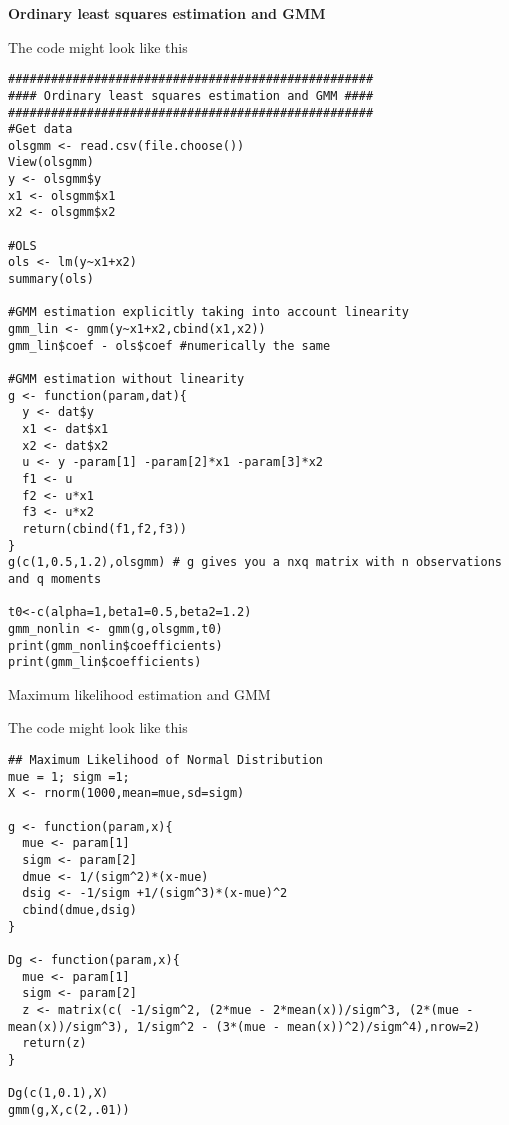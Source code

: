 \begin{Solution}{14.3}
\textbf{Ordinary least squares estimation and GMM}

The code might look like this
\begin{verbatim}
###################################################
#### Ordinary least squares estimation and GMM ####
###################################################
#Get data
olsgmm <- read.csv(file.choose())
View(olsgmm)
y <- olsgmm$y
x1 <- olsgmm$x1
x2 <- olsgmm$x2

#OLS
ols <- lm(y~x1+x2)
summary(ols)

#GMM estimation explicitly taking into account linearity
gmm_lin <- gmm(y~x1+x2,cbind(x1,x2))
gmm_lin$coef - ols$coef #numerically the same

#GMM estimation without linearity
g <- function(param,dat){
  y <- dat$y
  x1 <- dat$x1
  x2 <- dat$x2
  u <- y -param[1] -param[2]*x1 -param[3]*x2
  f1 <- u
  f2 <- u*x1
  f3 <- u*x2
  return(cbind(f1,f2,f3))
}
g(c(1,0.5,1.2),olsgmm) # g gives you a nxq matrix with n observations and q moments

t0<-c(alpha=1,beta1=0.5,beta2=1.2)
gmm_nonlin <- gmm(g,olsgmm,t0)
print(gmm_nonlin$coefficients)
print(gmm_lin$coefficients)
\end{verbatim}
\end{Solution}
\begin{Solution}{14.4}
Maximum likelihood estimation and GMM

The code might look like this
\begin{verbatim}
## Maximum Likelihood of Normal Distribution
mue = 1; sigm =1;
X <- rnorm(1000,mean=mue,sd=sigm)

g <- function(param,x){
  mue <- param[1]
  sigm <- param[2]
  dmue <- 1/(sigm^2)*(x-mue)
  dsig <- -1/sigm +1/(sigm^3)*(x-mue)^2
  cbind(dmue,dsig)
}

Dg <- function(param,x){
  mue <- param[1]
  sigm <- param[2]
  z <- matrix(c( -1/sigm^2, (2*mue - 2*mean(x))/sigm^3, (2*(mue - mean(x))/sigm^3), 1/sigm^2 - (3*(mue - mean(x))^2)/sigm^4),nrow=2)
  return(z)
}

Dg(c(1,0.1),X)
gmm(g,X,c(2,.01))
\end{verbatim}
\end{Solution}
